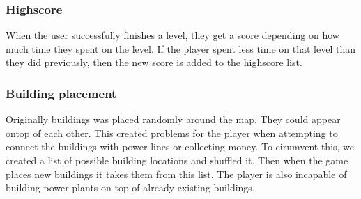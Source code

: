 	

	\subsubsection*{Highscore}

	When the user successfully finishes a level, they get a score depending on
	how much time they spent on the level. If the player spent less time on that
	level than they did previously, then the new score is added to the highscore
	list.

	\subsubsection*{Building placement}

	Originally buildings was placed randomly around the map. They could appear
	ontop of each other. This created problems for the player when attempting to
	connect the buildings with power lines or collecting money. To cirumvent
	this, we created a list of possible building locations and shuffled it. Then
	when the game places new buildings it takes them from this list. The player
	is also incapable of building power plants on top of already existing
	buildings.
	
